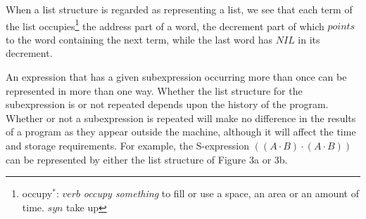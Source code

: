 \documentclass[11pt, a4paper]{article}
\begin{document}
When a list structure is regarded as representing a list, we see that each term
of the list
occupies\footnote{occupy$^*$: $verb$ \textit{occupy something} to fill or use a
  space, an area or an amount of time. $syn$ take up}
the address part of a word, the decrement part of which
$points$ to the word containing the next term, while the last word has $NIL$ in
its decrement.

An expression that has a given subexpression occurring more than once can be
represented in more than one way. Whether the list structure for the
subexpression is or not repeated depends upon the history of the
program. Whether or not a subexpression is repeated will make no difference in
the results of a program as they appear outside the machine, although it will
affect the time and storage requirements. For example, the S-expression $((A
\cdot B) \cdot (A \cdot B))$ can be represented by either the list structure of
Figure 3a or 3b.

\begin{figure}[h]
  \begin{subfigure}{0.49\textwidth}
    \center
    \caption{}
  \end{subfigure}
  \begin{subfigure}{0.49\textwidth}
    \center
    \caption{}
  \end{subfigure}
  \caption{}
\end{figure}
\end{document}
